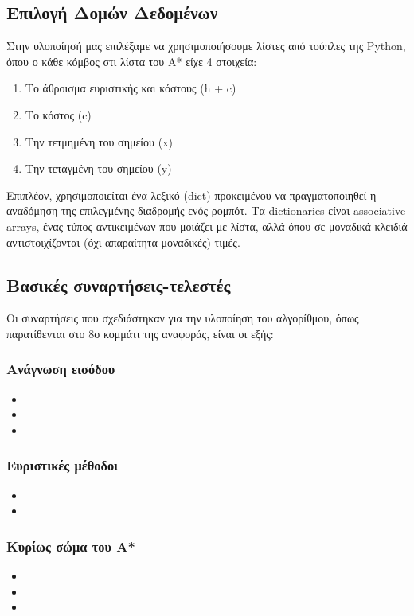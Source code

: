 \documentclass[a4paper,9pt]{article}
\begin{document}


\subsection{Επιλογή Δομών Δεδομένων}
Στην υλοποίησή μας επιλέξαμε να χρησιμοποιήσουμε λίστες από τούπλες της Python,
όπου ο κάθε κόμβος στι λίστα του A* είχε 4 στοιχεία:
\begin{enumerate}
    \item Το άθροισμα ευριστικής και κόστους (h + c)
    \item Το κόστος (c)
    \item Την τετμημένη του σημείου (x)
    \item Την τεταγμένη του σημείου (y)
\end{enumerate}

Επιπλέον, χρησιμοποιείται ένα λεξικό (dict) προκειμένου να
πραγματοποιηθεί η αναδόμηση της επιλεγμένης διαδρομής ενός ρομπότ. Τα
dictionaries είναι associative arrays, ένας τύπος αντικειμένων που μοιάζει με
λίστα, αλλά όπου σε μοναδικά κλειδιά αντιστοιχίζονται (όχι απαραίτητα
μοναδικές) τιμές.



\subsection{Βασικές συναρτήσεις-τελεστές}
Οι συναρτήσεις που σχεδιάστηκαν για την υλοποίηση του αλγορίθμου, όπως
παρατίθενται στο 8ο κομμάτι της αναφοράς, είναι οι εξής:
\subsubsection{Ανάγνωση εισόδου}
    \begin{itemize}
	\item
	\item
	\item
    \end{itemize}
\subsubsection{Eυριστικές μέθοδοι}
    \begin{itemize}
	\item
	\item
    \end{itemize}
\subsubsection{Κυρίως σώμα του Α*}
    \begin{itemize}
	\item
	\item
	\item
    \end{itemize}
\end{document}
